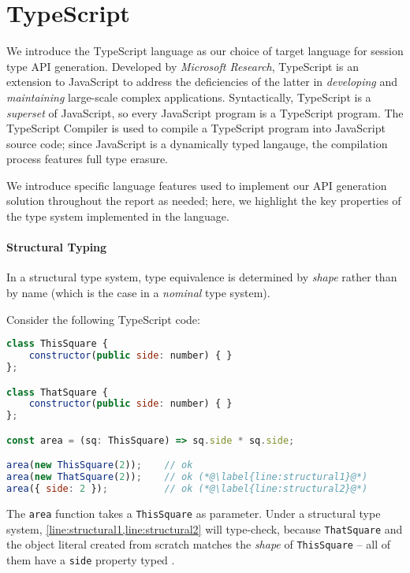 \section{TypeScript}
\label{section:typescript}

We introduce the TypeScript language 
\cite{UnderstandingTypeScript}
as our choice of target language
for session type API generation.
Developed by \textit{Microsoft Research},
TypeScript is an extension to
JavaScript to address
the deficiencies of the latter in
\textit{developing} and \textit{maintaining}
large-scale complex applications.
Syntactically,
TypeScript is a \textit{superset} of JavaScript,
so every JavaScript program is a
TypeScript program.
The TypeScript Compiler is used
to compile a TypeScript program into JavaScript
source code; since
JavaScript is a dynamically typed langauge,
the compilation process features full type erasure.

We introduce specific language
features used to implement our API generation
solution throughout the report as needed;
here, we highlight the key properties
of the type system implemented in the language.

\paragraph{Structural Typing}
In a structural type system, type equivalence
is determined by \textit{shape} rather than by name
(which is the case in a \textit{nominal} type system).

Consider the following TypeScript code:

\begin{lstlisting}[language=javascript]
class ThisSquare {
	constructor(public side: number) { }
};

class ThatSquare {
	constructor(public side: number) { }
};

const area = (sq: ThisSquare) => sq.side * sq.side;

area(new ThisSquare(2));	// ok
area(new ThatSquare(2));	// ok (*@\label{line:structural1}@*)
area({ side: 2 });			// ok (*@\label{line:structural2}@*)
\end{lstlisting}

The \texttt{area} function takes a \texttt{ThisSquare}
as parameter.
Under a structural type system,
\cref{line:structural1,line:structural2}
will type-check, because \texttt{ThatSquare} and the object
literal created from scratch matches the \textit{shape}
of \texttt{ThisSquare} -- all of them have a \texttt{side}
property typed .


